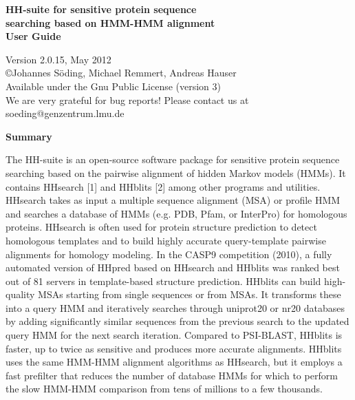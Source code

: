 \documentclass[11pt,a4paper]{article}
\begin{document}


\begin{center}

\vspace{20mm}
 
{\huge \bf HH-suite for sensitive protein sequence\\[2mm] searching based on HMM-HMM alignment}\\[4mm] 

{\Large \bf User Guide}

  Version 2.0.15, May 2012\\[2mm]
{\copyright  Johannes S\"oding, Michael Remmert, Andreas Hauser}\\[2mm]
Available under the Gnu Public License (version 3)\\[2mm]
We are very grateful for bug reports! Please contact us at soeding@genzentrum.lmu.de

{\bf \Large Summary}

\end{center}

\noindent The HH-suite is an open-source software package for sensitive protein sequence searching based on the pairwise alignment of hidden Markov models (HMMs). It contains HHsearch [1] and HHblits [2] among other programs and utilities. HHsearch takes as input a multiple sequence alignment (MSA) or profile HMM and searches a database of HMMs (e.g. PDB, Pfam, or InterPro) for homologous proteins. HHsearch is often used for protein structure prediction to detect homologous templates and to build highly accurate query-template pairwise alignments for homology modeling. In the CASP9 competition (2010), a fully automated version of HHpred based on HHsearch and HHblits was ranked best out of 81 servers in template-based structure prediction. HHblits can build high-quality MSAs starting from single sequences or from MSAs. It transforms these into a query HMM and iteratively searches through uniprot20 or nr20 databases by adding significantly similar sequences from the previous search to the updated query HMM for the next search iteration. Compared to PSI-BLAST, HHblits is faster, up to twice as sensitive and produces more accurate alignments. HHblits uses the same HMM-HMM alignment algorithms as HHsearch, but it employs a fast prefilter that reduces the number of database HMMs for which to perform the slow HMM-HMM comparison from tens of millions to a few thousands. 
\\[2mm]
\end{document}
